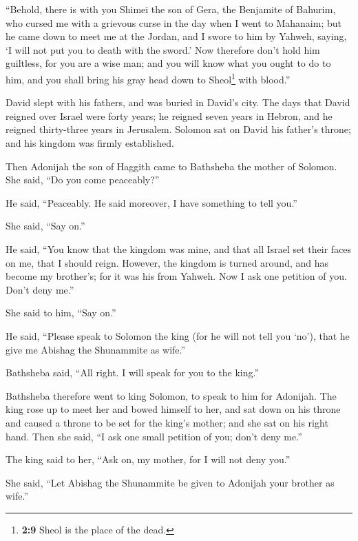  ``Behold, there is with you Shimei the son of Gera, the
Benjamite of Bahurim, who cursed me with a grievous curse in the day
when I went to Mahanaim; but he came down to meet me at the Jordan, and
I swore to him by Yahweh, saying, `I will not put you to death with the
sword.'  Now therefore don't hold him guiltless, for you
are a wise man; and you will know what you ought to do to him, and you
shall bring his gray head down to Sheol\footnote{\textbf{2:9} Sheol is
  the place of the dead.} with blood.''

 David slept with his fathers, and was buried in David's
city.  The days that David reigned over Israel were forty
years; he reigned seven years in Hebron, and he reigned thirty-three
years in Jerusalem.  Solomon sat on David his father's
throne; and his kingdom was firmly established.

 Then Adonijah the son of Haggith came to Bathsheba the
mother of Solomon. She said, ``Do you come peaceably?''

He said, ``Peaceably.  He said moreover, I have something
to tell you.''

She said, ``Say on.''

 He said, ``You know that the kingdom was mine, and that
all Israel set their faces on me, that I should reign. However, the
kingdom is turned around, and has become my brother's; for it was his
from Yahweh.  Now I ask one petition of you. Don't deny
me.''

She said to him, ``Say on.''

 He said, ``Please speak to Solomon the king (for he will
not tell you `no'), that he give me Abishag the Shunammite as wife.''

 Bathsheba said, ``All right. I will speak for you to the
king.''

 Bathsheba therefore went to king Solomon, to speak to
him for Adonijah. The king rose up to meet her and bowed himself to her,
and sat down on his throne and caused a throne to be set for the king's
mother; and she sat on his right hand.  Then she said,
``I ask one small petition of you; don't deny me.''

The king said to her, ``Ask on, my mother, for I will not deny you.''

 She said, ``Let Abishag the Shunammite be given to
Adonijah your brother as wife.''

